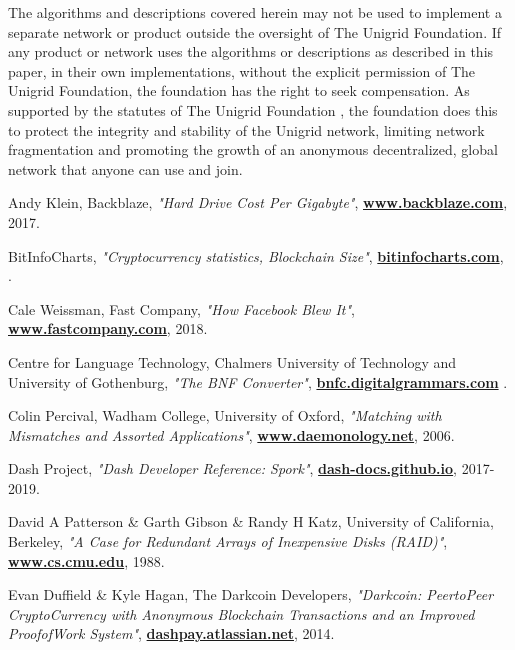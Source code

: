 \documentclass[10pt,a4paper,final]{article}
\let\oldhref\href
\renewcommand{\href}[2]{\oldhref{#1}{\bfseries#2}}
\begin{document}
The algorithms and descriptions covered herein may not be used to implement a separate network or product outside the oversight of The Unigrid Foundation. If any product or network uses the algorithms or descriptions as described in this paper, in their own implementations, without the explicit permission of The Unigrid Foundation, the foundation has the right to seek compensation. As supported by the statutes of The Unigrid Foundation \cite{unigridstatutes}, the foundation does this to protect the integrity and stability of the Unigrid network, limiting network fragmentation and promoting the growth of an anonymous decentralized, global network that anyone can use and join.

\clearpage

\begin{thebibliography}{999}

	Andy Klein, Backblaze,
	\emph{"Hard Drive Cost Per Gigabyte"},
	\href{https://www.backblaze.com/blog/hard-drive-cost-per-gigabyte}{www.backblaze.com},
	2017.

	BitInfoCharts,
	\emph{"Cryptocurrency statistics, Blockchain Size"},
	\href{https://bitinfocharts.com}{bitinfocharts.com},
	\the\year{}.

	Cale Weissman, Fast Company,
	\emph{"How Facebook Blew It"},
	\href{https://www.fastcompany.com/40550423/how-facebook-blew-it}{www.fastcompany.com},
	2018.

	Centre for Language Technology, Chalmers University of Technology and University of Gothenburg,
	\emph{"The BNF Converter"},
	\href{https://bnfc.digitalgrammars.com/}{bnfc.digitalgrammars.com}
	\the\year{}.

	Colin Percival, Wadham College, University of Oxford,
	\emph{"Matching with Mismatches and Assorted Applications"},
	\href{http://www.daemonology.net/papers/thesis.pdf}{www.daemonology.net},
	2006.

	Dash Project,
	\emph{"Dash Developer Reference: Spork"},
	\href{https://dash-docs.github.io/en/developer-reference\%23spork}{dash-docs.github.io},
	2017-2019.

	David A Patterson \& Garth Gibson \& Randy H Katz, University of California, Berkeley,
	\emph{"A Case for Redundant Arrays of Inexpensive Disks (RAID)"},
	\href{https://www.cs.cmu.edu/~garth/RAIDpaper/Patterson88.pdf}{www.cs.cmu.edu},
	1988.

	Evan Duffield \& Kyle Hagan, The Darkcoin Developers,
	\emph{"Darkcoin: Peer­to­Peer Crypto­Currency with Anonymous Blockchain Transactions and an Improved Proof­of­Work System"},
	\href{https://dashpay.atlassian.net/wiki/download/attachments/132120878/Darkcoin\%20Whitepaper.pdf}{dashpay.atlassian.net},
	2014.


\end{thebibliography}
\end{document}
